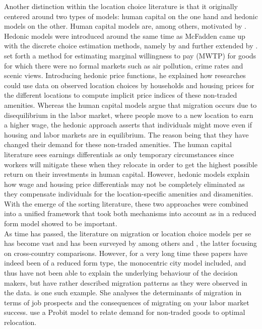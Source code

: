 Another distinction within the location choice literature is that it originally centered around two types of models: human capital on the one hand and hedonic models on the other. Human capital models are, among others, motivated by \citet{Topel1986}. Hedonic models were introduced around the same time as McFadden came up with the discrete choice estimation methods, namely by \citet{Rosen1974} and further extended by \citet{Roback1982}. \citet{Rosen1974} set forth a method for estimating marginal willingness to pay (MWTP) for goods for which there were no formal markets such as air pollution, crime rates and scenic views. Introducing hedonic price functions, he explained how researches could use data on observed location choices by households and housing prices for the different locations to compute implicit price indices of these non-traded amenities. Whereas the human capital models argue that migration occurs due to disequilibrium in the labor market, where people move to a new location to earn a higher wage, the hedonic approach asserts that individuals might move even if housing and labor markets are in equilibrium. The reason being that they have changed their demand for these non-traded amenities. The human capital literature sees earnings differentials as only temporary circumstances since workers will mitigate these when they relocate in order to get the highest possible return on their investments in human capital. However, hedonic models explain how wage and housing price differentials may not be completely eliminated as they compensate individuals for the location-specific amenities and disamenities. With the emerge of the sorting literature, these two approaches were combined into a unified framework that took both mechanisms into account as \citet{Clark1991} in a reduced form model showed to be important. \\

As time has passed, the literature on migration or location choice models per se has become vast and has been surveyed by among others \citet{Greenwood1997} and \citet{Lucas1997}, the latter focusing on cross-country comparisons. However, for a very long time these papers have indeed been of a reduced form type, the monocentric city model included, and thus have not been able to explain the underlying behaviour of the decision makers, but have rather described migration patterns as they were observed in the data. \citet{Bartel1979} is one such example. She analyses the determinants of migration in terms of job prospects and the consequences of migrating on your labor market success. \citet{Graves1979} use a Probit model to relate demand for non-traded goods to optimal relocation. 

